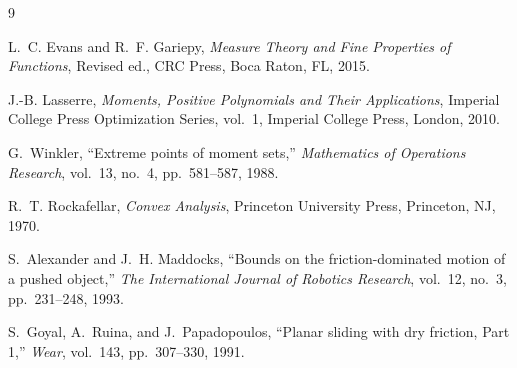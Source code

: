 \documentclass[11pt,a4paper]{article}
\theoremstyle{plain}
\begin{document}

\begin{thebibliography}{9}

L.~C. Evans and R.~F. Gariepy,
\newblock \emph{Measure Theory and Fine Properties of Functions},
\newblock Revised ed., CRC Press, Boca Raton, FL, 2015.

J.-B. Lasserre,
\newblock \emph{Moments, Positive Polynomials and Their Applications},
\newblock Imperial College Press Optimization Series, vol.~1,
Imperial College Press, London, 2010.

G.~Winkler,
\newblock ``Extreme points of moment sets,''
\newblock \emph{Mathematics of Operations Research},
vol.~13, no.~4, pp.~581--587, 1988.

R.~T. Rockafellar,
\newblock \emph{Convex Analysis},
\newblock Princeton University Press, Princeton, NJ, 1970.

S.~Alexander and J.~H. Maddocks,
\newblock ``Bounds on the friction-dominated motion of a pushed object,''
\newblock \emph{The International Journal of Robotics Research}, vol.~12, no.~3, pp.~231--248, 1993.

S.~Goyal, A.~Ruina, and J.~Papadopoulos,
\newblock ``Planar sliding with dry friction, Part 1,''
\newblock \emph{Wear}, vol.~143, pp.~307--330, 1991.

\end{thebibliography}
\end{document}
